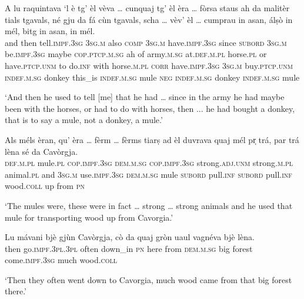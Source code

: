 \begin{linenumbers}
\gll A lu raquintava `l è tg’ èl vèva … cunquaj tg' èl èra … fòrsa staus ah da malitèr tials tgavals, né gju da fá cùn tgavals, scha … vèv’ èl … cumprau in asan, álṣò in mél, bitg in asan, in mél.   \\
and then tell.\textsc{impf.3sg} \textsc{3sg.m} also \textsc{comp} \textsc{3sg.m} have.\textsc{impf.3sg} {} since \textsc{subord} \textsc{3sg.m} be.\textsc{impf.3sg} {} maybe \textsc{cop.ptcp.m.sg} ah  of army.\textsc{m.sg} at.\textsc{def.m.pl} horse.\textsc{pl} or have.\textsc{ptcp.unm}  to do.\textsc{inf} with horse.\textsc{m.pl} \textsc{corr} {} have.\textsc{impf.3sg} \textsc{3sg.m} {}  buy.\textsc{ptcp.unm}  \textsc{indef.m.sg} donkey this\_is \textsc{indef.m.sg} mule \textsc{neg} \textsc{indef.m.sg} donkey \textsc{indef.m.sg} mule \\
\end{linenumbers}
\medskip
\glt `And then he used to tell [me] that he had … since in the army he had maybe been with the horses, or had to do with horses, then ... he had bought a donkey, that is to say a mule, not a donkey, a mule.'
\medskip

\begin{linenumbers}
\gll Als méls èran, qu’ èra … fèrm … fèrms tiarṣ ad èl duvrava quaj mél pr̩ trá, par trá lèna sé da Cavòrgja.   \\
 \textsc{def.m.pl} mule.\textsc{pl} \textsc{cop.impf.3sg} \textsc{dem.m.sg} \textsc{cop.impf.3sg} {} strong.\textsc{adj.unm} {} strong.\textsc{m.pl} animal.\textsc{pl} and \textsc{3sg.m} use.\textsc{impf.3sg} \textsc{dem.m.sg} mule \textsc{subord} pull.\textsc{inf} \textsc{subord} pull.\textsc{inf} wood.\textsc{coll} up from \textsc{pn}  \\
\end{linenumbers}
\medskip
\glt `The mules were, these were in fact … strong … strong animals and he used that mule for transporting wood up from Cavorgia.'
\medskip

\begin{linenumbers}
\gll  Lu mávani bjè gjùn Cavòrgja, cò da quaj gròn uaul\footnotemark{} vagnéva bjè lèna.\\
then go.\textsc{impf.3pl.3pl} often down\_in \textsc{pn} here from \textsc{dem.m.sg} big forest come.\textsc{impf.3sg} much wood.\textsc{coll}  \\
\end{linenumbers}
\medskip
\glt `Then they often went down to Cavorgia, much wood came from that big forest there.'
\medskip

